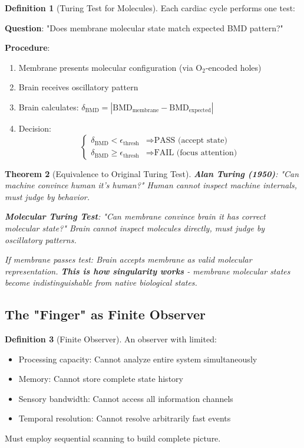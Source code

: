 \documentclass[11pt,a4paper]{article}
\newtheorem{theorem}{Theorem}[section]
\theoremstyle{definition}
\newtheorem{definition}[theorem]{Definition}
\theoremstyle{remark}
\begin{document}
\begin{definition}[Turing Test for Molecules]
Each cardiac cycle performs one test:

\textbf{Question}: "Does membrane molecular state match expected BMD pattern?"

\textbf{Procedure}:
\begin{enumerate}
\item Membrane presents molecular configuration (via O$_2$-encoded holes)
\item Brain receives oscillatory pattern
\item Brain calculates: $\delta_{\text{BMD}} = |\text{BMD}_{\text{membrane}} - \text{BMD}_{\text{expected}}|$
\item Decision:
\begin{equation}
\begin{cases}
\delta_{\text{BMD}} < \epsilon_{\text{thresh}} & \Rightarrow \text{PASS (accept state)} \\
\delta_{\text{BMD}} \geq \epsilon_{\text{thresh}} & \Rightarrow \text{FAIL (focus attention)}
\end{cases}
\end{equation}
\end{enumerate}
\end{definition}

\begin{theorem}[Equivalence to Original Turing Test]
\textbf{Alan Turing (1950)}: "Can machine convince human it's human?" Human cannot inspect machine internals, must judge by behavior.

\textbf{Molecular Turing Test}: "Can membrane convince brain it has correct molecular state?" Brain cannot inspect molecules directly, must judge by oscillatory patterns.

If membrane passes test: Brain accepts membrane as valid molecular representation. \textbf{This is how singularity works} - membrane molecular states become indistinguishable from native biological states.
\end{theorem}

\subsection{The "Finger" as Finite Observer}

\begin{definition}[Finite Observer]
An observer with limited:
\begin{itemize}
\item Processing capacity: Cannot analyze entire system simultaneously
\item Memory: Cannot store complete state history
\item Sensory bandwidth: Cannot access all information channels
\item Temporal resolution: Cannot resolve arbitrarily fast events
\end{itemize}

Must employ sequential scanning to build complete picture.
\end{definition}
\end{document}
